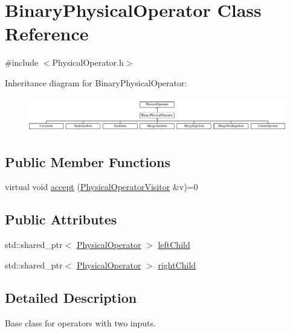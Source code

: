 \hypertarget{class_binary_physical_operator}{\section{Binary\+Physical\+Operator Class Reference}
\label{class_binary_physical_operator}
}


{\ttfamily \#include $<$Physical\+Operator.\+h$>$}

Inheritance diagram for Binary\+Physical\+Operator\+:\begin{figure}[H]
\begin{center}
\leavevmode
\includegraphics[height=1.538462cm]{class_binary_physical_operator}
\end{center}
\end{figure}
\subsection*{Public Member Functions}
\begin{DoxyCompactItemize}
\item 
virtual void \hyperlink{class_binary_physical_operator_a29ec622920006cb5428bf2c259918347}{accept} (\hyperlink{class_physical_operator_visitor}{Physical\+Operator\+Visitor} \&v)=0
\end{DoxyCompactItemize}
\subsection*{Public Attributes}
\begin{DoxyCompactItemize}
\item 
std\+::shared\+\_\+ptr$<$ \hyperlink{class_physical_operator}{Physical\+Operator} $>$ \hyperlink{class_binary_physical_operator_a60ea09dbc34f680f024a9946c3634cbd}{left\+Child}
\item 
std\+::shared\+\_\+ptr$<$ \hyperlink{class_physical_operator}{Physical\+Operator} $>$ \hyperlink{class_binary_physical_operator_a9247498cd4b4e35968e2aa78bac17016}{right\+Child}
\end{DoxyCompactItemize}


\subsection{Detailed Description}
Base class for operators with two inputs. 

